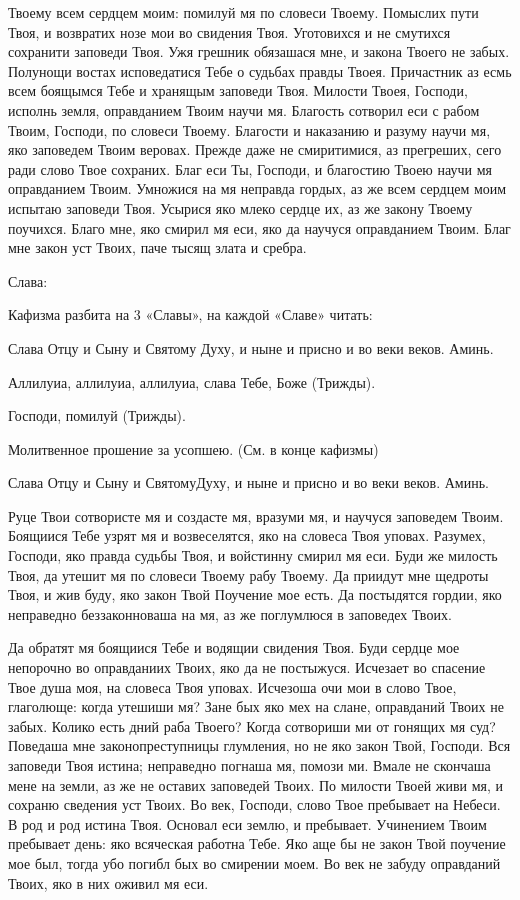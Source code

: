 \begin{mymulticols}
Твоему всем сердцем моим: помилуй мя по словеси Твоему. Помыслих пути Твоя, и возвратих нозе мои во свидения Твоя. Уготовихся и не смутихся сохранити заповеди Твоя. Ужя грешник обязашася мне, и закона Твоего не забых. Полунощи востах исповедатися Тебе о судьбах правды Твоея. Причастник аз есмь всем боящымся Тебе и хранящым заповеди Твоя. Милости Твоея, Господи, исполнь земля, оправданием Твоим научи мя. Благость сотворил еси с рабом Твоим, Господи, по словеси Твоему. Благости и наказанию и разуму научи мя, яко заповедем Твоим веровах. Прежде даже не смиритимися, аз прегреших, сего ради слово Твое сохраних. Благ еси Ты, Господи, и благостию Твоею научи мя оправданием Твоим. Умножися на мя неправда гордых, аз же всем сердцем моим испытаю заповеди Твоя. Усырися яко млеко сердце их, аз же закону Твоему поучихся. Благо мне, яко смирил мя еси, яко да научуся оправданием Твоим. Благ мне закон уст Твоих, паче тысящ злата и сребра. 

Слава: 

Кафизма разбита на 3 «Славы», на каждой «Славе» читать: 

Слава Отцу и Сыну и Святому Духу, и ныне и присно и во веки веков. Аминь. 

Аллилуиа, аллилуиа, аллилуиа, слава Тебе, Боже (Трижды). 

Господи, помилуй (Трижды). 

Молитвенное прошение за усопшею. (См. в конце кафизмы) 

Слава Отцу и Сыну и СвятомуДуху, и ныне и присно и во веки веков. Аминь. 

Руце Твои сотвористе мя и создасте мя, вразуми мя, и научуся заповедем Твоим. Боящиися Тебе узрят мя и возвеселятся, яко на словеса Твоя уповах. Разумех, Господи, яко правда судьбы Твоя, и войстинну смирил мя еси. Буди же милость Твоя, да утешит мя по словеси Твоему рабу Твоему. Да приидут мне щедроты Твоя, и жив буду, яко закон Твой Поучение мое есть. Да постыдятся гордии, яко неправедно беззаконноваша на мя, аз же поглумлюся в заповедех Твоих. 

Да обратят мя боящиися Тебе и водящии свидения Твоя. Буди сердце мое непорочно во оправданиих Твоих, яко да не постыжуся. Исчезает во спасение Твое душа моя, на словеса Твоя уповах. Исчезоша очи мои в слово Твое, глаголюще: когда утешиши мя? Зане бых яко мех на слане, оправданий Твоих не забых. Колико есть дний раба Твоего? Когда сотвориши ми от гонящих мя суд? Поведаша мне законопреступницы глумления, но не яко закон Твой, Господи. Вся заповеди Твоя истина; неправедно погнаша мя, помози ми. Вмале не скончаша мене на земли, аз же не оставих заповедей Твоих. По милости Твоей живи мя, и сохраню сведения уст Твоих. Во век, Господи, слово Твое пребывает на Небеси. В род и род истина Твоя. Основал еси землю, и пребывает. Учинением Твоим пребывает день: яко всяческая работна Тебе. Яко аще бы не закон Твой поучение мое был, тогда убо погибл бых во смирении моем. Во век не забуду оправданий Твоих, яко в них оживил мя еси. 


\end{mymulticols}
